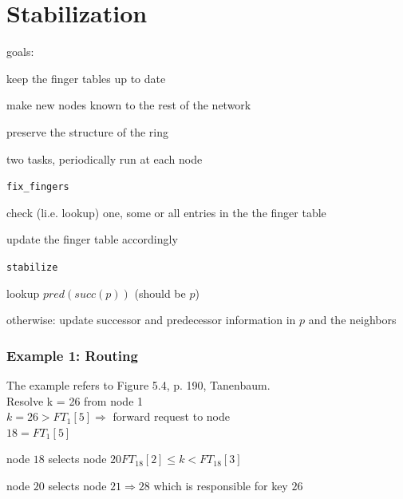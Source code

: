 \documentclass[ngerman,a4paper]{report}
\begin{document}
\section{Stabilization}
\begin{compactitem}
\item goals:
\begin{compactitem}
\item keep the finger tables up to date
\item make new nodes known to the rest of the network
\item preserve the structure of the ring
\end{compactitem}
\item two tasks, periodically run at each node
\begin{compactenum}
\item \lstinline$fix_fingers$
\begin{compactitem}
\item check (li.e. lookup) one, some or all entries in the the finger table
\item update the finger table accordingly
\end{compactitem}
\item \lstinline$stabilize$
\begin{compactitem}
\item lookup $pred(succ(p))$ (should be $p$)
\item otherwise: update successor and predecessor information in $p$ and the neighbors
\end{compactitem}
\end{compactenum}
\end{compactitem}

\subsubsection{Example 1: Routing}
The example refers to Figure 5.4, p. 190, Tanenbaum.\\
Resolve k = 26 from node 1 \\
$k=26 > FT_1[5] \Rightarrow$ forward request to node\\
$18 = FT_1[5]$
\begin{compactitem}
\item node $18$ selects node $20 FT_{18}[2] \leq k < FT_{18}[3]$
\item node $20$ selects node $21 \Rightarrow 28 $ which is responsible for key $26$
\end{compactitem}
\ \\
\end{document}
